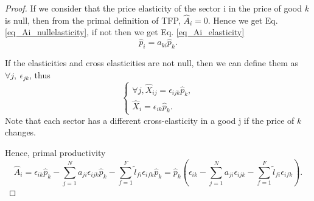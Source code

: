 \documentclass[11pt]{article}
\begin{document}
\begin{proof}
    
If we consider that the price elasticity of the sector i in the price of good $k$ is null, then from the primal definition of TFP, $\hat{A}_i=0$. 
Hence we get Eq. \ref{eq_Ai_nullelasticity}, if not then we get Eq. \ref{eq_Ai_elasticity}
\begin{equation}
\label{eq_Ai_nullelasticity}
     \hat{p}_i= a_{k i} \hat{p}_{k}.
\end{equation}





If the elasticities and cross elasticities are not null, then we can define them as $\forall j,~\epsilon_{jk}$, 
thus 
\begin{equation}
\begin{cases}
    \forall j, \hat{X}_{ij}=\epsilon_{ijk}\hat{p}_{k},\\
     \hat{X}_{i}=\epsilon_{ik}\hat{p}_{k}.
\end{cases}
\end{equation}
Note that each sector has a different cross-elasticity in a good j if the price of $k$ changes.

Hence, primal productivity 
\begin{equation}
\label{eq_Ai_elasticity}
    \hat{A}_i= \epsilon_{ik}\hat{p}_{k}-  \sum_{j=1}^N  a_{ji} \epsilon_{ijk}\hat{p}_{k}- \sum_{f=1}^F  \tilde{l}_{fi}\epsilon_{ifk}\hat{p}_{k}=
    \hat{p}_{k}\left(
    \epsilon_{ik}-  \sum_{j=1}^N  a_{ji} \epsilon_{ijk}- \sum_{f=1}^F  \tilde{l}_{fi}\epsilon_{ifk}
    \right).
\end{equation}


\end{proof}
\end{document}

